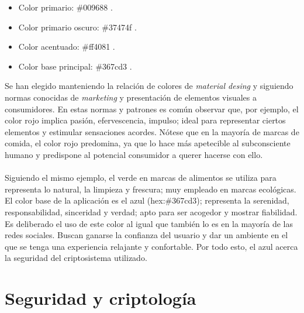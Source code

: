 \documentclass[../PFC.tex]{subfiles}
\begin{document}
\begin{itemize}
\item{Color primario: \#009688 .}
\item{Color primario oscuro: \#37474f .}
\item{Color acentuado: \#ff4081 .}
\item{Color base principal: \#367cd3 .}
\end{itemize}

Se han elegido manteniendo la relación de colores de \textit{material desing} y siguiendo normas conocidas de \textit{marketing} y presentación de elementos visuales a consumidores. En estas normas y patrones es común observar que, por ejemplo, el color rojo implica pasión, efervescencia, impulso; ideal para representar ciertos elementos y estimular sensaciones acordes. Nótese que en la mayoría de marcas de comida, el color rojo predomina, ya que lo hace más apetecible al subconsciente humano y predispone al potencial consumidor a querer hacerse con ello. 
\\\\
Siguiendo el mismo ejemplo, el verde en marcas de alimentos se utiliza para representa lo natural, la limpieza y frescura; muy empleado en marcas ecológicas. El color base de la aplicación es el azul (hex:\#367cd3); representa la serenidad, responsabilidad, sinceridad y verdad; apto para ser acogedor y mostrar fiabilidad. Es deliberado el uso de este color al igual que también lo es en la mayoría de las redes sociales. Buscan ganarse la confianza del usuario y dar un ambiente en el que se tenga una experiencia relajante y confortable. Por todo esto, el azul acerca la seguridad del criptosistema utilizado.

\section{Seguridad y criptología}
\label{App:Seguridad y criptología}
\end{document}
